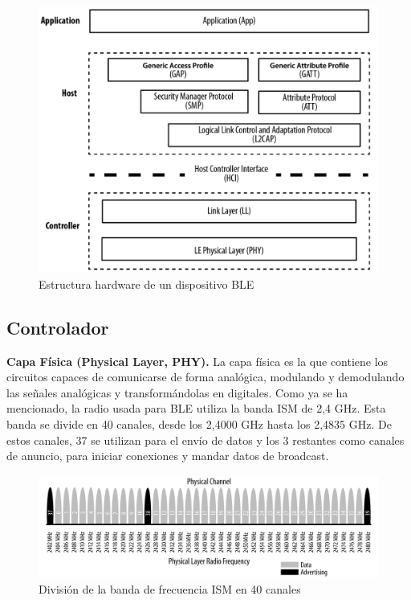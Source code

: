 \begin{figure}[h]%
	\centering
    \includegraphics[scale=0.4]{figures/ble_hardware.png} %
    \caption[Estructura hardware de un dispositivo BLE]{Estructura hardware de un dispositivo BLE}
   	\label{figuraBLEHardware}
\end{figure}

\subsection{Controlador}
\label{makereference2.2.1}

\textbf{Capa Física (Physical Layer, PHY).} La capa física es la que contiene los circuitos capaces de comunicarse de forma analógica, modulando y demodulando las señales analógicas y transformándolas en digitales.
Como ya se ha mencionado, la radio usada para BLE utiliza la banda ISM de 2,4 GHz. Esta banda se divide en 40 canales, desde los 2,4000 GHz hasta los 2,4835 GHz. De estos canales, 37 se utilizan para el envío de datos y los 3 restantes como canales de anuncio, para iniciar conexiones y mandar datos de broadcast.

\begin{figure}[h]%
	\centering
    \includegraphics[width=\linewidth]{figures/ble_physical_layer.png} %
    \caption[División de la banda de frecuencia ISM]{División de la banda de frecuencia ISM en 40 canales}
   	\label{figuraBLEPhysicalLayer}
\end{figure}

